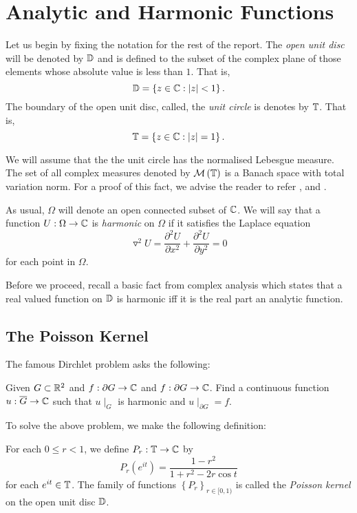 \chapter{Analytic and Harmonic Functions}
Let us begin by fixing the notation for the rest of the report. The \textit{open unit disc} will be denoted by $\mathbb D$ and is defined to the subset of the complex plane of those elements whose absolute value is less than $1$. That is,
\begin{equation*}
    \mathbb D = \left\{ z \in \mathbb C : \left\lvert z \right\rvert < 1 \right\}.
\end{equation*}
The boundary of the open unit disc, called, the \textit{unit circle} is denotes by $\mathbb T$. That is, 
\begin{equation*}
    \mathbb T = \left\{ z \in \mathbb C : \left\lvert z \right\rvert = 1 \right\}.
\end{equation*}

We will assume that the the unit circle has the normalised Lebesgue measure. The set of all complex measures denoted by ${\cal M} \left( \mathbb T \right)$ is a Banach space with total variation norm. For a proof of this fact, we advise the reader to refer \cite{cohn2013measure}, \cite{axler2020measure} and \cite{rudin1987real}.

As usual, $\Omega$ will denote an open connected subset of $\mathbb C$. We will say that a function $U : \Omega \to \mathbb C$ is \textit{harmonic} on $\Omega$ if it satisfies the Laplace equation
\begin{equation*}
    \triangledown ^{2} U = \frac{\partial ^{2} U}{\partial x^{2}} + \frac{\partial ^{2} U}{\partial y^{2}} =0
\end{equation*}
for each point in $\Omega$.


Before we proceed, recall a basic fact from complex analysis which states that a real valued function on $\mathbb D$ is harmonic iff it is the real part an analytic function.

\section{The Poisson Kernel}
The famous Dirchlet problem asks the following:


Given $G \subset \mathbb R ^{2}$ and $f: \partial G \to \mathbb C$ and $f: \partial G \to \mathbb C$. Find a continuous function $u: \overline{G} \to \mathbb C$ such that $u\mid _{G}$  is harmonic and $u\mid_{\partial G} =f$.

To solve the above problem, we make the following definition:

\begin{definition}
    For each $0\le r < 1$, we define $P_r : \mathbb T \to \mathbb C$ by
    \begin{equation*}
	P_{r} \left( e^{it} \right) = \frac{1-r^{2}}{1+r^{2}-2r\cos t}
    \end{equation*}
    for each $e^{it} \in \mathbb T$.
    The family of functions $\left\{ P_{r} \right\}_{r\in [0,1)}$ is called the \textit{Poisson kernel} on the open unit disc $\mathbb D$.
    \label{def:Poisson-kernel}
\end{definition}

